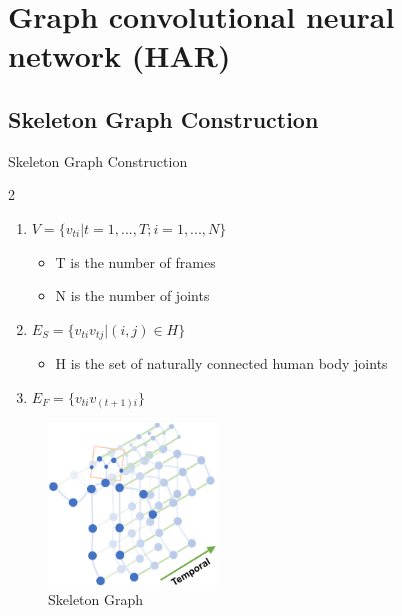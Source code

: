 \section{Graph convolutional neural network (HAR)}

\subsection{Skeleton Graph Construction}
\begin{frame}{Skeleton Graph Construction}
    \begin{multicols} {2}
        \begin{enumerate}
            \item $V = \{v_{ti} | t = 1,...,T; i = 1,...,N\}$
                  \begin{itemize}
                      \item T is the number of frames
                      \item N is the number of joints
                  \end{itemize}
            \item $E_S = \{v_{ti}v_{tj} | (i, j) \in H\}$
                  \begin{itemize}
                      \item H is the set of naturally connected human body joints
                  \end{itemize}
            \item $E_F = \{v_{ti}v_{(t+1)i}\}$
        \end{enumerate}

        \begin{figure}[htp]
            \centering
            \includegraphics[width=0.4\textwidth]{topics/201031-yan2018spatial/assets/img/skeleton-st-graph.png}
            \caption{Skeleton Graph}
            \label{fig:skeleton-graph}
        \end{figure}
    \end{multicols}
\end{frame}

